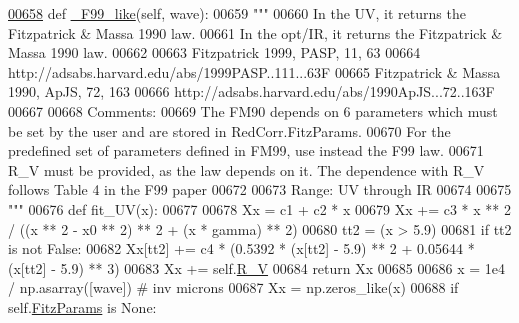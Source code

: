 \begin{DoxyVerb}
\begin{DoxyCode}
\hypertarget{classpyneb_1_1extinction_1_1red__corr_1_1_red_corr_l00658}{}\hyperlink{classpyneb_1_1extinction_1_1red__corr_1_1_red_corr_afa769aa42ed7d39fb04fd36fda88b54e}{00658}     \textcolor{keyword}{def }\hyperlink{classpyneb_1_1extinction_1_1red__corr_1_1_red_corr_afa769aa42ed7d39fb04fd36fda88b54e}{\_F99\_like}(self, wave):
00659         \textcolor{stringliteral}{"""}
00660 \textcolor{stringliteral}{        In the UV, it returns the Fitzpatrick & Massa 1990 law.}
00661 \textcolor{stringliteral}{        In the opt/IR, it returns the Fitzpatrick & Massa 1990 law. }
00662 \textcolor{stringliteral}{        }
00663 \textcolor{stringliteral}{        Fitzpatrick 1999, PASP, 11, 63}
00664 \textcolor{stringliteral}{        http://adsabs.harvard.edu/abs/1999PASP..111...63F}
00665 \textcolor{stringliteral}{        Fitzpatrick & Massa 1990, ApJS, 72, 163}
00666 \textcolor{stringliteral}{        http://adsabs.harvard.edu/abs/1990ApJS...72..163F}
00667 \textcolor{stringliteral}{        }
00668 \textcolor{stringliteral}{        Comments:}
00669 \textcolor{stringliteral}{        The FM90 depends on 6 parameters which must be set by the user and are stored in
       RedCorr.FitzParams.}
00670 \textcolor{stringliteral}{        For the predefined set of parameters defined in FM99, use instead the F99 law.}
00671 \textcolor{stringliteral}{        R\_V must be provided, as the law depends on it. The dependence with R\_V follows Table 4 in the F99
       paper }
00672 \textcolor{stringliteral}{}
00673 \textcolor{stringliteral}{        Range: UV through IR}
00674 \textcolor{stringliteral}{        }
00675 \textcolor{stringliteral}{        """}
00676         \textcolor{keyword}{def }fit\_UV(x):
00677 
00678             Xx = c1 + c2 * x
00679             Xx += c3 * x ** 2 / ((x ** 2 - x0 ** 2) ** 2 + (x * gamma) ** 2)
00680             tt2 = (x > 5.9) 
00681             \textcolor{keywordflow}{if} tt2 \textcolor{keywordflow}{is} \textcolor{keywordflow}{not} \textcolor{keyword}{False}:
00682                 Xx[tt2] += c4 * (0.5392 * (x[tt2] - 5.9) ** 2 + 0.05644 * (x[tt2] - 5.9) ** 3)
00683             Xx += self.\hyperlink{classpyneb_1_1extinction_1_1red__corr_1_1_red_corr_a4696ecdd84c912c20e6aa19b1573e875}{R\_V}
00684             \textcolor{keywordflow}{return} Xx
00685             
00686         x = 1e4 / np.asarray([wave]) \textcolor{comment}{# inv microns}
00687         Xx = np.zeros\_like(x)
00688         \textcolor{keywordflow}{if} self.\hyperlink{classpyneb_1_1extinction_1_1red__corr_1_1_red_corr_a133fcc7513d358e629266b24cbe7bebc}{FitzParams} \textcolor{keywordflow}{is} \textcolor{keywordtype}{None}:

\end{DoxyCode}
\end{DoxyVerb}

